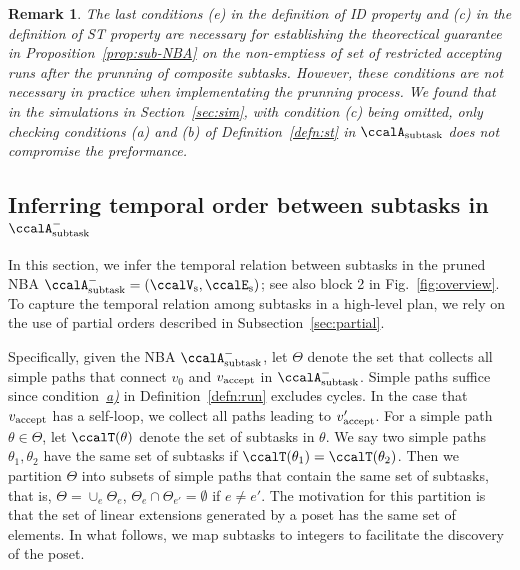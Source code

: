 \documentclass[Afour,sageh,times]{sagej}
\newtheorem{rem}[thm]{Remark}
\newcommand{\auto}[1]{\ccalA_{\textup{#1}}}
\newcommand{\vertex}[1]{v_{\textup{#1}}}
\begin{document}
\begin{rem}
  The last conditions {\it (e)} in the definition of ID property and {\it (c)} in the definition of ST property are necessary for establishing the theorectical guarantee in Proposition~\ref{prop:sub-NBA}  on the non-emptiess of  set of restricted accepting runs after the prunning of composite subtasks. However, these conditions are not necessary in practice when implementating the prunning process. We found that in the simulations in Section~\ref{sec:sim}, with condition {\it (c)} being omitted, only checking conditions {\it (a)} and {\it (b)} of Definition~\ref{defn:st} in $\auto{subtask}$  does not compromise  the preformance.
\end{rem}



\subsection{Inferring temporal order between subtasks in  $\auto{subtask}^-$}\label{sec:poset}
In this section,  we infer the temporal relation between subtasks in the pruned NBA $\auto{subtask}^- = (\ccalV_\text{s}, \ccalE_\text{s})$; see also block 2 in Fig.~\ref{fig:overview}.  To capture the temporal relation among subtasks in a high-level plan,  we rely on the use of partial orders described in Subsection~\ref{sec:partial}.


Specifically, given the NBA $\auto{subtask}^-$, let $\Theta$ denote the set that collects all simple paths that connect $v_0$ and $\vertex{accept}$ in $\auto{subtask}^-$. Simple paths suffice since condition~\hyperref[cond:a]{\it a)} in Definition~\ref{defn:run} excludes cycles. In the case that $\vertex{accept}$ has a self-loop, we collect all paths leading to $\vertex{accept}'$.
For a simple path $\theta \in\Theta$, let $\ccalT(\theta)$ denote the set of subtasks in $\theta$. We say two simple paths $\theta_1, \theta_2$ have the same set of subtasks if $\ccalT(\theta_1) =\ccalT(\theta_2)$. Then we partition $\Theta$ into subsets of  simple paths that contain the same set of subtasks, that is, $\Theta = \cup_e \Theta_e$, $\Theta_e \cap \Theta_{e'} = \emptyset$ if $e\not=e'$. The motivation for this partition is that the set of linear extensions generated by a poset has the same set of elements. {In what follows, we map subtasks to integers to facilitate the discovery of the  poset.}
\end{document}
